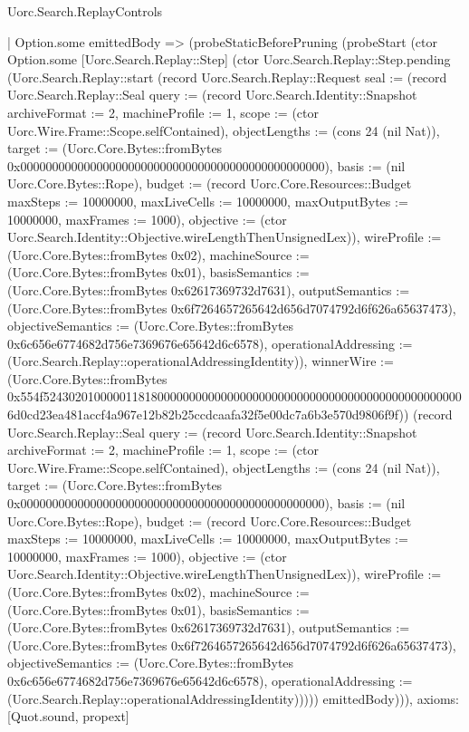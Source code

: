 \begin{lexlean}{Uorc.Search.ReplayControls}
\begin{semanticmodule}
{    | Option.some emittedBody => (probeStaticBeforePruning (probeStart (ctor Option.some [Uorc.Search.Replay::Step] (ctor Uorc.Search.Replay::Step.pending (Uorc.Search.Replay::start (record Uorc.Search.Replay::Request {seal := (record Uorc.Search.Replay::Seal {query := (record Uorc.Search.Identity::Snapshot {archiveFormat := 2, machineProfile := 1, scope := (ctor Uorc.Wire.Frame::Scope.selfContained), objectLengths := (cons 24 (nil Nat)), target := (Uorc.Core.Bytes::fromBytes 0x000000000000000000000000000000000000000000000000), basis := (nil Uorc.Core.Bytes::Rope), budget := (record Uorc.Core.Resources::Budget {maxSteps := 10000000, maxLiveCells := 10000000, maxOutputBytes := 10000000, maxFrames := 1000}), objective := (ctor Uorc.Search.Identity::Objective.wireLengthThenUnsignedLex)}), wireProfile := (Uorc.Core.Bytes::fromBytes 0x02), machineSource := (Uorc.Core.Bytes::fromBytes 0x01), basisSemantics := (Uorc.Core.Bytes::fromBytes 0x62617369732d7631), outputSemantics := (Uorc.Core.Bytes::fromBytes 0x6f7264657265642d656d7074792d6f626a65637473), objectiveSemantics := (Uorc.Core.Bytes::fromBytes 0x6c656e6774682d756e7369676e65642d6c6578), operationalAddressing := (Uorc.Search.Replay::operationalAddressingIdentity)}), winnerWire := (Uorc.Core.Bytes::fromBytes 0x554f5243020100000118180000000000000000000000000000000000000000000000006d0cd23ea481accf4a967e12b82b25ccdcaafa32f5e00dc7a6b3e570d9806f9f)}) (record Uorc.Search.Replay::Seal {query := (record Uorc.Search.Identity::Snapshot {archiveFormat := 2, machineProfile := 1, scope := (ctor Uorc.Wire.Frame::Scope.selfContained), objectLengths := (cons 24 (nil Nat)), target := (Uorc.Core.Bytes::fromBytes 0x000000000000000000000000000000000000000000000000), basis := (nil Uorc.Core.Bytes::Rope), budget := (record Uorc.Core.Resources::Budget {maxSteps := 10000000, maxLiveCells := 10000000, maxOutputBytes := 10000000, maxFrames := 1000}), objective := (ctor Uorc.Search.Identity::Objective.wireLengthThenUnsignedLex)}), wireProfile := (Uorc.Core.Bytes::fromBytes 0x02), machineSource := (Uorc.Core.Bytes::fromBytes 0x01), basisSemantics := (Uorc.Core.Bytes::fromBytes 0x62617369732d7631), outputSemantics := (Uorc.Core.Bytes::fromBytes 0x6f7264657265642d656d7074792d6f626a65637473), objectiveSemantics := (Uorc.Core.Bytes::fromBytes 0x6c656e6774682d756e7369676e65642d6c6578), operationalAddressing := (Uorc.Search.Replay::operationalAddressingIdentity)})))) emittedBody))),
  axioms: [Quot.sound, propext]
}


\end{semanticmodule}
\end{lexlean}
